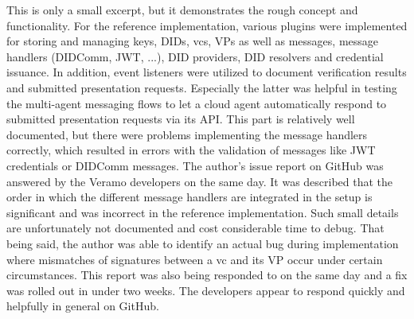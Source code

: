     This is only a small excerpt, but it demonstrates the rough concept and functionality. For the reference implementation, various plugins were implemented for storing and managing keys, \acp{DID}, \acp{vc}, \acp{VP} as well as messages, message handlers (DIDComm, JWT, ...), \ac{DID} providers, \ac{DID} resolvers and credential issuance. In addition, event listeners were utilized to document verification results and submitted presentation requests. Especially the latter was helpful in testing the multi-agent messaging flows to let a cloud agent automatically respond to submitted presentation requests via its API. This part is relatively well documented, but there were problems implementing the message handlers correctly, which resulted in errors with the validation of messages like JWT credentials or DIDComm messages. The author's issue report on GitHub was answered by the Veramo developers on the same day. It was described that the order in which the different message handlers are integrated in the setup is significant and was incorrect in the reference implementation. Such small details are unfortunately not documented and cost considerable time to debug. That being said, the author was able to identify an actual bug during implementation where mismatches of signatures between a \ac{vc} and its \ac{VP} occur under certain circumstances. This report was also being responded to on the same day and a fix was rolled out in under two weeks. The developers appear to respond quickly and helpfully in general on GitHub.
    
